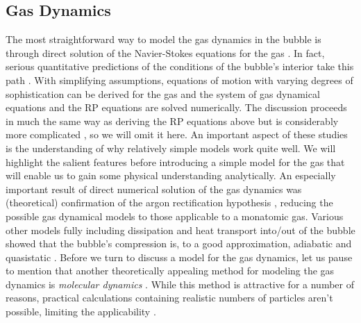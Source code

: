 \documentclass[prb,aps,nofootinbib,superscriptaddress,floatfix]{revtex4-2}
\begin{document}
\subsection{Gas Dynamics}
The most straightforward way to model the gas dynamics in the bubble is through direct solution of the Navier-Stokes equations for the gas \cite{brenner2002single}. In fact, serious quantitative predictions of the conditions of the bubble's interior take this path \cite{an2006mechanism,an2008spectral,an2009diagnosing,flannigan2005plasma,flannigan2006measurement}. With simplifying assumptions, equations of motion with varying degrees of sophistication can be derived for the gas and the system of gas dynamical equations and the RP equations are solved numerically. The discussion proceeds in much the same way as deriving the RP equations above but is considerably more complicated \cite{brenner2002single,yasui2018acoustic}, so we will omit it here. An important aspect of these studies is the understanding of why relatively simple models work quite well. We will highlight the salient features before introducing a simple model for the gas that will enable us to gain some physical understanding analytically. An especially important result of direct numerical solution of the gas dynamics was (theoretical) confirmation of the argon rectification hypothesis \cite{}, reducing the possible gas dynamical models to those applicable to a monatomic gas. Various other models fully including dissipation and heat transport into/out of the bubble showed that the bubble's compression is, to a good approximation, adiabatic and quasistatic \cite{}. Before we turn to discuss a model for the gas dynamics, let us pause to mention that another theoretically appealing method for modeling the gas dynamics is \emph{molecular dynamics} \cite{}. While this method is attractive for a number of reasons, practical calculations containing realistic numbers of particles aren't possible, limiting the applicability \cite{brenner2002single}.
\end{document}
